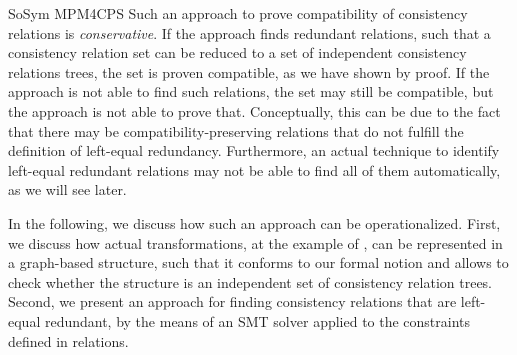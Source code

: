 \begin{copiedFrom}{SoSym MPM4CPS}
Such an approach to prove compatibility of consistency relations is \emph{conservative}.
If the approach finds redundant relations, such that a consistency relation set can be reduced to a set of independent consistency relations trees, the set is proven compatible, as we have shown by proof.
If the approach is not able to find such relations, the set may still be compatible, but the approach is not able to prove that.
Conceptually, this can be due to the fact that there may be compatibility-preserving relations that do not fulfill the definition of left-equal redundancy.
Furthermore, an actual technique to identify left-equal redundant relations may not be able to find all of them automatically, as we will see later.


In the following, we discuss how such an approach can be operationalized.
First, we discuss how actual transformations, at the example of \qvtr, can be represented in a graph-based structure, such that it conforms to our formal notion and allows to check whether the structure is an independent set of consistency relation trees.
Second, we present an approach for finding consistency relations that are left-equal redundant, by the means of an SMT solver applied to the constraints defined in \qvtr relations.






\end{copiedFrom} %